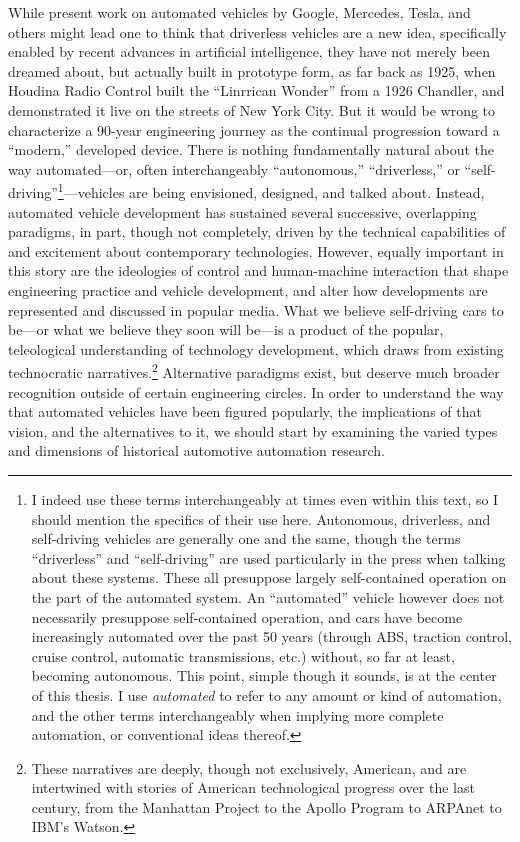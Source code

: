 While present work on automated vehicles by Google, Mercedes, Tesla,
and others might lead one to think that driverless vehicles are a
new idea, specifically enabled by recent advances in artificial
intelligence, they have not merely been dreamed about, but actually
built in prototype form, as far back as 1925, when Houdina Radio Control
built the ``Linrrican Wonder'' from a 1926 Chandler, and demonstrated
it live on the streets of New York City. But it would be wrong to
characterize a 90-year engineering journey as the continual
progression toward a ``modern,'' developed device. There is nothing
fundamentally natural about the way automated---or, often interchangeably
``autonomous,'' ``driverless,'' or ``self-driving''\footnote{I indeed use these terms
  interchangeably at times even within this text, so I should mention
the specifics of their use here. Autonomous, driverless, and self-driving
vehicles are generally one and the same, though the terms
``driverless'' and
``self-driving'' are used particularly in the press when talking about
these systems. These all presuppose largely self-contained operation
on the part of the automated system. An ``automated'' vehicle however
does not necessarily presuppose self-contained operation, and cars
have become increasingly automated over the past 50 years (through
ABS, traction control, cruise control, automatic transmissions, etc.) without, so
far at least, becoming autonomous. This point, simple though it
sounds, is at the center of this thesis. I use \emph{automated} to refer to any amount
or kind of automation, and the other terms interchangeably when
implying more complete automation, or conventional ideas thereof.}---vehicles are being
envisioned, designed, and talked about. Instead, automated vehicle
development has sustained several successive, overlapping paradigms,
in part, though not completely, driven by the technical capabilities
of and excitement about contemporary technologies. However, equally
important in this story are the ideologies of control and
human-machine interaction that shape engineering practice and vehicle 
development, and alter how developments are represented and discussed
in popular media. What we believe self-driving cars to be---or what we
believe they soon will be---is a product of the popular, teleological understanding
of technology development, which draws from existing technocratic
narratives.\footnote{These narratives are deeply, though 
  not exclusively, American, and are intertwined with stories of
  American technological progress over the last century, from the
  Manhattan Project to the Apollo Program to ARPAnet to IBM's
  Watson.} Alternative paradigms exist,
but deserve much broader recognition outside of certain engineering circles. In
order to understand the way that automated vehicles have been figured
popularly, the implications of that vision, and the alternatives to
it, we should start by examining the varied types and dimensions
of historical automotive automation research.

